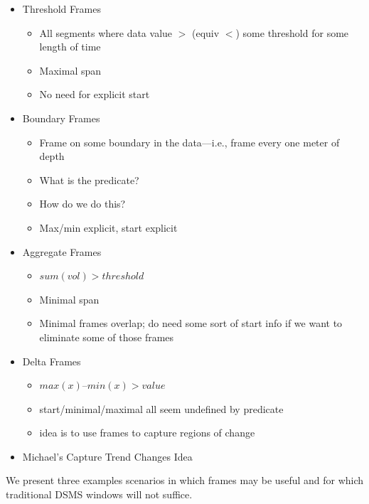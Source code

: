 \documentclass{vldb}
\begin{document}
\begin{itemize}

\item Threshold Frames
\begin{itemize}
\item All segments where data value $>$ (equiv $<$) some threshold for some length of time
\item Maximal span 
\item No need for explicit start
\end{itemize}

\item Boundary Frames
\begin{itemize}
\item Frame on some boundary in the data--–i.e., frame every one meter of depth
\item What is the predicate?
\item How do we do this?
\item Max/min explicit, start explicit
\end{itemize}

\item Aggregate Frames
\begin{itemize}
\item $sum(vol) > threshold$
\item Minimal span
\item Minimal frames overlap; do need some sort of start info if we want to eliminate some of those frames 
\end{itemize}

\item Delta Frames
\begin{itemize}
\item $max(x) – min(x) > value$
\item start/minimal/maximal all seem undefined by predicate
\item idea is to use frames to capture regions of change
\end{itemize}

\item Michael’s Capture Trend Changes Idea

\end{itemize}

We present three examples scenarios in which frames may be useful and for which traditional DSMS windows will not suffice. 
\end{document}
